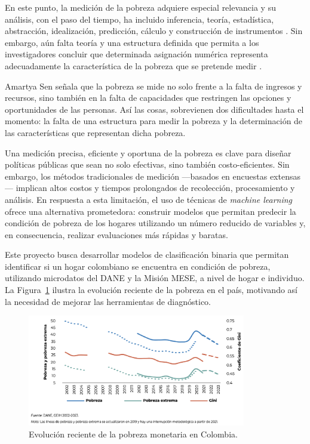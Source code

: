 \documentclass[12pt,a4paper,onecolumn]{article}
\begin{document}
En este punto, la medición de la pobreza adquiere especial relevancia y su análisis, con el paso del tiempo, ha incluido inferencia, teoría, estadística, abstracción, idealización, predicción, cálculo y construcción de instrumentos \parencite{Tal2016}. Sin embargo, aún falta teoría y una estructura definida que permita a los investigadores concluir que determinada asignación numérica representa adecuadamente la característica de la pobreza que se pretende medir \parencite{HuffmanNajera2024}.

Amartya Sen señala que la pobreza se mide no solo frente a la falta de ingresos y recursos, sino también en la falta de capacidades que restringen las opciones y oportunidades de las personas. Así las cosas, sobrevienen dos dificultades hasta el momento: la falta de una estructura para medir la pobreza y la determinación de las características que representan dicha pobreza.

Una medición precisa, eficiente y oportuna de la pobreza es clave para diseñar políticas públicas que sean no solo efectivas, sino también costo-eficientes. Sin embargo, los métodos tradicionales de medición —basados en encuestas extensas— implican altos costos y tiempos prolongados de recolección, procesamiento y análisis. En respuesta a esta limitación, el uso de técnicas de \textit{machine learning} ofrece una alternativa prometedora: construir modelos que permitan predecir la condición de pobreza de los hogares utilizando un número reducido de variables y, en consecuencia, realizar evaluaciones más rápidas y baratas.

Este proyecto busca desarrollar modelos de clasificación binaria que permitan identificar si un hogar colombiano se encuentra en condición de pobreza, utilizando microdatos del DANE y la Misión MESE, a nivel de hogar e individuo. La Figura~\ref{fig:pobreza_colombia} ilustra la evolución reciente de la pobreza en el país, motivando así la necesidad de mejorar las herramientas de diagnóstico.

\begin{figure}[H]
  \centering
  \includegraphics[width=0.85\textwidth]{../views/figures/pobreza_colombia.png}
  \caption{Evolución reciente de la pobreza monetaria en Colombia.}
  \label{fig:pobreza_colombia}
\end{figure}
\end{document}
